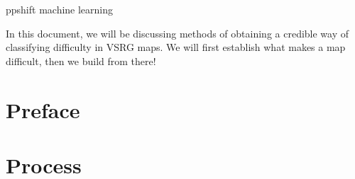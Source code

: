\documentclass{article}
\begin{document}
	ppshift machine learning
	
	In this document, we will be discussing methods of obtaining a credible way of classifying difficulty in VSRG maps. We will first establish what makes a map difficult, then we build from there!
	
\newpage
\part{Preface}


\newpage


\newpage
\part{Process}


\newpage

\newpage

\newpage

\newpage

\end{document}
